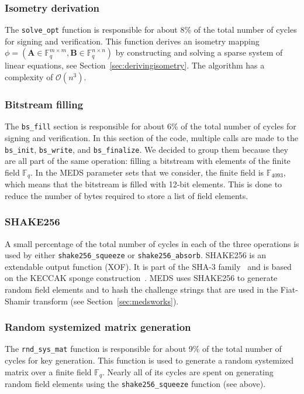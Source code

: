 \documentclass[11pt,a4paper]{report}
\theoremstyle{definition}
\begin{document}
\subsubsection{Isometry derivation}
The \texttt{solve\_opt} function is responsible for about 8\% of the total number of cycles for signing and verification. This function derives an isometry mapping $\phi = (\textbf{A} \in \mathbb{F}_q^{m \times m}, \textbf{B} \in \mathbb{F}_q^{n \times n})$ by constructing and solving a sparse system of linear equations, see Section~\ref{sec:derivingisometry}. The algorithm has a complexity of $\mathcal{O}(n^3)$.

\subsubsection{Bitstream filling}
The \texttt{bs\_fill} section is responsible for about 6\% of the total number of cycles for signing and verification. In this section of the code, multiple calls are made to the \texttt{bs\_init}, \texttt{bs\_write}, and \texttt{bs\_finalize}. We decided to group them because they are all part of the same operation: filling a bitstream with elements of the finite field $\mathbb{F}_q$. In the MEDS parameter sets that we consider, the finite field is $\mathbb{F}_{4093}$, which means that the bitstream is filled with 12-bit elements. This is done to reduce the number of bytes required to store a list of field elements.

\subsubsection{SHAKE256}
\label{sec:shake256}
A small percentage of the total number of cycles in each of the three operations is used by either \texttt{shake256\_squeeze} or \texttt{shake256\_absorb}. SHAKE256 is an extendable output function (XOF). It is part of the SHA-3 family~\cite{dworkin2015sha} and is based on the KECCAK sponge construction~\cite{bertoni2013keccak}. MEDS uses SHAKE256 to generate random field elements and to hash the challenge strings that are used in the Fiat-Shamir transform (see Section~\ref{sec:medsworks}).

\subsubsection{Random systemized matrix generation}
The \texttt{rnd\_sys\_mat} function is responsible for about 9\% of the total number of cycles for key generation. This function is used to generate a random systemized matrix over a finite field $\mathbb{F}_q$. Nearly all of its cycles are spent on generating random field elements using the \texttt{shake256\_squeeze} function (see above).
\end{document}
